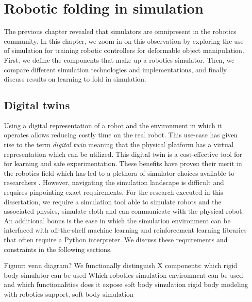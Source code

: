 \documentclass[\home/main.tex]{subfiles}
\begin{document}
\graphicspath{{\home/figures}}

\chapter{Robotic folding in simulation}\label{ch:simulation}


The previous chapter revealed that simulators are omnipresent in the robotics community. 
In this chapter, we zoom in on this observation by exploring the use of simulation for training robotic controllers for deformable object manipulation. First, we define the components that make up a robotics simulator. Then, we compare different simulation technologies and implementations, and finally discuss results on learning to fold in simulation. 

\section{Digital twins}

Using a digital representation of a robot and the environment in which it operates allows reducing costly time on the real robot. This use-case has given rise to the term \emph{digital twin} meaning that the physical platform has a virtual representation which can be utilized. This digital twin is a cost-effective tool for for learning and safe experimentation. These benefits have proven their merit in the robotics field which has led to a plethora of simulator choices available to researchers \autocite{Collins2021}. However, navigating the simulation landscape is difficult and requires pinpointing exact requirements. For the research executed in this dissertation, we require a simulation tool able to simulate robots and the associated physics, simulate cloth and can communicate with the physical robot. An additional bonus is the ease in which the simulation environment can be interfaced with off-the-shelf machine learning and reinforcement learning libraries that often require a Python interpreter. 
We discuss these requirements and constraints in the following sections. 

Figuur: venn diagram? 
We functionally distinguish X components: 
    which rigid body simulator can be used
    Which robotics simulation environment can be used and which functionalities does it expose 
    soft body simulation 
rigid body modeling with robotics support, soft body simulation
\end{document}
